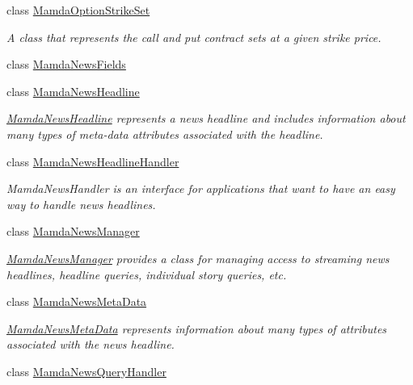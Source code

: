 \begin{CompactItemize}
class \hyperlink{classWombat_1_1MamdaOptionStrikeSet}{Mamda\-Option\-Strike\-Set}
\begin{CompactList}\small\item\em A class that represents the call and put contract sets at a given strike price. \item\end{CompactList}\item 
class \hyperlink{classWombat_1_1MamdaNewsFields}{Mamda\-News\-Fields}
\item 
class \hyperlink{classWombat_1_1MamdaNewsHeadline}{Mamda\-News\-Headline}
\begin{CompactList}\small\item\em \hyperlink{classWombat_1_1MamdaNewsHeadline}{Mamda\-News\-Headline} represents a news headline and includes information about many types of meta-data attributes associated with the headline. \item\end{CompactList}\item 
class \hyperlink{classWombat_1_1MamdaNewsHeadlineHandler}{Mamda\-News\-Headline\-Handler}
\begin{CompactList}\small\item\em Mamda\-News\-Handler is an interface for applications that want to have an easy way to handle news headlines. \item\end{CompactList}\item 
class \hyperlink{classWombat_1_1MamdaNewsManager}{Mamda\-News\-Manager}
\begin{CompactList}\small\item\em \hyperlink{classWombat_1_1MamdaNewsManager}{Mamda\-News\-Manager} provides a class for managing access to streaming news headlines, headline queries, individual story queries, etc. \item\end{CompactList}\item 
class \hyperlink{classWombat_1_1MamdaNewsMetaData}{Mamda\-News\-Meta\-Data}
\begin{CompactList}\small\item\em \hyperlink{classWombat_1_1MamdaNewsMetaData}{Mamda\-News\-Meta\-Data} represents information about many types of attributes associated with the news headline. \item\end{CompactList}\item 
class \hyperlink{classWombat_1_1MamdaNewsQueryHandler}{Mamda\-News\-Query\-Handler}

\end{CompactItemize}

